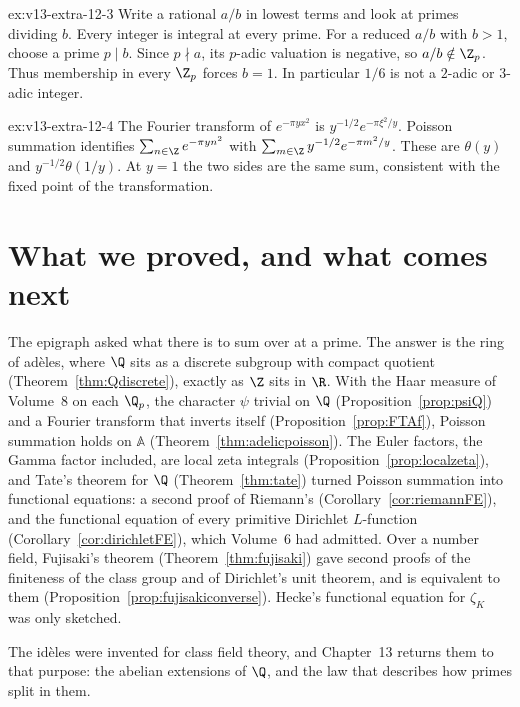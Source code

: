 \begin{solution}{ex:v13-extra-12-3}
\idea Write a rational $a/b$ in lowest terms and look at primes dividing $b$.
\writeup Every integer is integral at every prime. For a reduced $a/b$ with $b>1$, choose a prime $p\mid b$. Since $p\nmid a$, its $p$-adic valuation is negative, so $a/b\notin\Z_p$. Thus membership in every $\Z_p$ forces $b=1$. In particular $1/6$ is not a $2$-adic or $3$-adic integer.
\end{solution}

\begin{solution}{ex:v13-extra-12-4}
\idea The Fourier transform of $e^{-\pi yx^2}$ is $y^{-1/2}e^{-\pi\xi^2/y}$.
\writeup Poisson summation identifies $\sum_{n\in\Z}e^{-\pi yn^2}$ with $\sum_{m\in\Z}y^{-1/2}e^{-\pi m^2/y}$. These are $\theta(y)$ and $y^{-1/2}\theta(1/y)$. At $y=1$ the two sides are the same sum, consistent with the fixed point of the transformation.
\end{solution}

\section{What we proved, and what comes next}

The epigraph asked what there is to sum over at a prime. The answer is the ring of ad\`eles, where $\Q$ sits as a discrete subgroup
with compact quotient (Theorem~\ref{thm:Qdiscrete}), exactly as $\Z$ sits in $\R$. With the Haar measure of Volume~8 on each $\Q_p$, the
character $\psi$ trivial on $\Q$ (Proposition~\ref{prop:psiQ}) and a Fourier transform that inverts itself (Proposition~\ref{prop:FTAf}),
Poisson summation holds on $\mathbb A$ (Theorem~\ref{thm:adelicpoisson}). The Euler factors, the Gamma factor included, are local
zeta integrals (Proposition~\ref{prop:localzeta}), and Tate's theorem for $\Q$ (Theorem~\ref{thm:tate}) turned Poisson summation
into functional equations: a second proof of Riemann's (Corollary~\ref{cor:riemannFE}), and the functional equation of every
primitive Dirichlet $L$-function (Corollary~\ref{cor:dirichletFE}), which Volume~6 had admitted. Over a number field, Fujisaki's
theorem (Theorem~\ref{thm:fujisaki}) gave second proofs of the finiteness of the class group and of Dirichlet's unit theorem, and is
equivalent to them (Proposition~\ref{prop:fujisakiconverse}). Hecke's functional equation for $\zeta_K$ was only sketched.

The id\`eles were invented for class field theory, and Chapter~13 returns them to that purpose: the abelian extensions of $\Q$, and the
law that describes how primes split in them.

